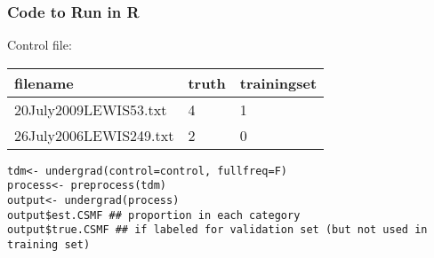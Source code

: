\documentclass{beamer}
\numberwithin{equation}{section}
\begin{document}
\begin{frame}
\frametitle{Code to Run in R}


Control file: \\
\begin{tabular}{lll}
filename & truth & trainingset \\
\hline
20July2009LEWIS53.txt & 4 & \alert{1} \\
26July2006LEWIS249.txt & 2 & \alert{0} \\
\hline
\end{tabular}



{\tt tdm<- undergrad(control=control, fullfreq=F)  } \\
{\tt process<- preprocess(tdm) } \\
{\tt output<- undergrad(process) } \\
{\tt output\$est.CSMF \#\# proportion in each category} \\
{\tt output\$true.CSMF \#\# if labeled for validation set (but not used in training set) }



\end{frame}
\end{document}
